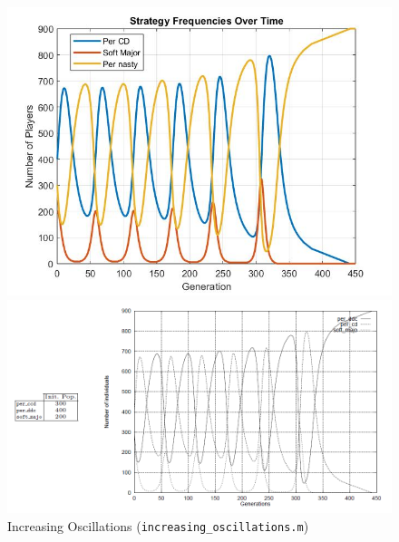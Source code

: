 \begin{figure}[ht!]
\centering
	\begin{minipage}{0.48\textwidth}
	\includegraphics[width=1\linewidth]{fit_plots_theoretical/Increasing_Oscillations}

	
	\end{minipage}
	\begin{minipage}{0.48\textwidth}
		\includegraphics[width=1\linewidth]{Increasing_Oscillations}
	\end{minipage}
	\caption{Increasing Oscillations (\texttt{increasing\_oscillations.m})}
\end{figure}

